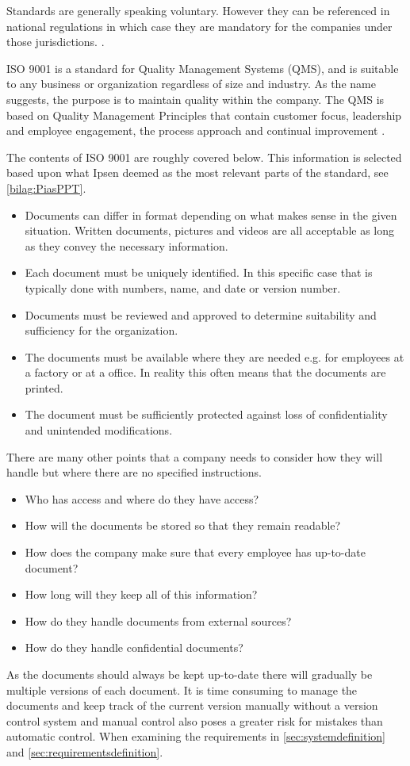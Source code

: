 Standards are generally speaking voluntary.
However they can be referenced in national regulations in which case they are mandatory for the companies under those jurisdictions. \cite{ISOreviewedevery5years}.

ISO 9001 is a standard for Quality Management Systems (QMS), and is suitable to any business or organization regardless of size and industry.
As the name suggests, the purpose is to maintain quality within the company. \cite{ISO9001}
The QMS is based on Quality Management Principles that contain customer focus, leadership and employee engagement, the process approach and continual improvement \cite{ISO9001-2}.

The contents of ISO 9001 are roughly covered below.
This information is selected based upon what Ipsen deemed as the most relevant parts of the standard, see \cref{bilag:PiasPPT}.

\begin{itemize}
	\item
	Documents can differ in format depending on what makes sense in the given situation. 
	Written documents, pictures and videos are all acceptable as long as they convey the necessary information.
	\item
	Each document must be uniquely identified.
	In this specific case that is typically done with numbers, name, and date or version number.
	\item
	Documents must be reviewed and approved to determine suitability and sufficiency for the organization.
	\item
	The documents must be available where they are needed e.g. for employees at a factory or at a office.
	In reality this often means that the documents are printed.
	\item
	The document must be sufficiently protected against loss of confidentiality and unintended modifications.
\end{itemize}

There are many other points that a company needs to consider how they will handle but where there are no specified instructions.

\begin{itemize}
	\item Who has access and where do they have access?
	\item How will the documents be stored so that they remain readable?
	\item How does the company make sure that every employee has up-to-date document?
	\item How long will they keep all of this information?
	\item How do they handle documents from external sources?
	\item How do they handle confidential documents?
\end{itemize}

As the documents should always be kept up-to-date there will gradually be multiple versions of each document.
It is time consuming to manage the documents and keep track of the current version manually without a version control system and manual control also poses a greater risk for mistakes than automatic control.
When examining the requirements in \cref{sec:systemdefinition} and \cref{sec:requirementsdefinition}.

